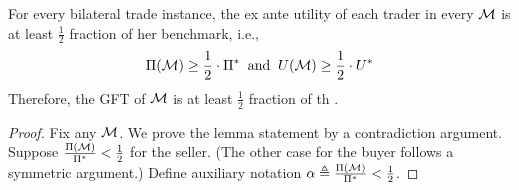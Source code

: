 \begin{lemma}
\label{lem:NSWM trader approx}
    For every bilateral trade instance, the ex ante utility of each trader in every {\NashSocialWelfareMaximizer} $\mathcal{M}$ is at least $\frac{1}{2}$ fraction of her benchmark, i.e.,
    \begin{align*}
        \Pi(\mathcal{M}) \geq \frac{1}{2} \cdot \Pi^*
        \;\;\mbox{and}\;\;
        U(\mathcal{M}) \geq \frac{1}{2} \cdot U^*  
    \end{align*}
    Therefore, the GFT of {\NashSocialWelfareMaximizer} $\mathcal{M}$ is at least $\frac{1}{2}$ fraction of th {\SecondBest}. 
\end{lemma}
\begin{proof}
    Fix any {\NashSocialWelfareMaximizer} $\mathcal{M}$. 
    We prove the lemma statement by a contradiction argument. 
    Suppose $\frac{\Pi(\mathcal{M})}{\Pi^*} < \frac{1}{2}$ for the seller. (The other case for the buyer follows a symmetric argument.) Define auxiliary notation $\alpha \triangleq \frac{\Pi(\mathcal{M})}{\Pi^*} < \frac{1}{2}$.


\end{proof}
